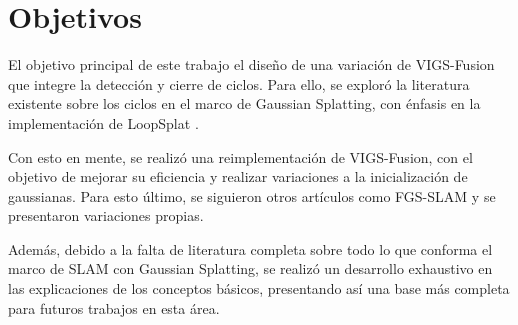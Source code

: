 \section{Objetivos}

El objetivo principal de este trabajo el diseño de una variación de VIGS-Fusion \cite{ndoye2025vigs} que integre la detección y cierre de ciclos. Para ello, se exploró la literatura existente sobre los ciclos en el marco de Gaussian Splatting, con énfasis en la implementación de LoopSplat \cite{zhu2025_loopsplat}.

Con esto en mente, se realizó una reimplementación de VIGS-Fusion, con el objetivo de mejorar su eficiencia y realizar variaciones a la inicialización de gaussianas. Para esto último, se siguieron otros artículos como FGS-SLAM \cite{xu2025fgsslamfourierbasedgaussiansplatting} y se presentaron variaciones propias.

Además, debido a la falta de literatura completa sobre todo lo que conforma el marco de SLAM con Gaussian Splatting, se realizó un desarrollo exhaustivo en las explicaciones de los conceptos básicos, presentando así una base más completa para futuros trabajos en esta área.

